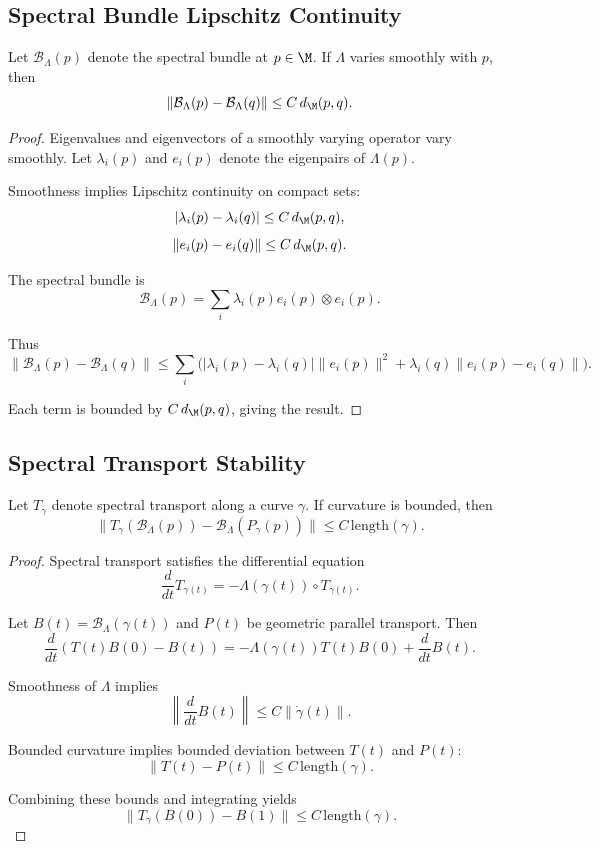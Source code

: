 \subsection{Spectral Bundle Lipschitz Continuity}

\begin{lemma}
Let $\mathcal{B}_\Lambda(p)$ denote the spectral bundle at $p \in \M$.
If $\Lambda$ varies smoothly with $p$, then
\[
\|\mathcal{B}_\Lambda(p) - \mathcal{B}_\Lambda(q)\|
\le
C\, d_\M(p,q).
\]
\end{lemma}

\begin{proof}
Eigenvalues and eigenvectors of a smoothly varying operator vary smoothly.
Let $\lambda_i(p)$ and $e_i(p)$ denote the eigenpairs of $\Lambda(p)$.

Smoothness implies Lipschitz continuity on compact sets:
\[
|\lambda_i(p) - \lambda_i(q)| \le C\, d_\M(p,q),
\]
\[
\|e_i(p) - e_i(q)\| \le C\, d_\M(p,q).
\]

The spectral bundle is
\[
\mathcal{B}_\Lambda(p)
= \sum_i \lambda_i(p) e_i(p) \otimes e_i(p).
\]

Thus
\[
\|\mathcal{B}_\Lambda(p) - \mathcal{B}_\Lambda(q)\|
\le
\sum_i
\big(
|\lambda_i(p) - \lambda_i(q)| \|e_i(p)\|^2
+ \lambda_i(q) \|e_i(p) - e_i(q)\|
\big).
\]

Each term is bounded by $C\, d_\M(p,q)$, giving the result.
\end{proof}

\subsection{Spectral Transport Stability}

\begin{lemma}
Let $T_\gamma$ denote spectral transport along a curve $\gamma$.  
If curvature is bounded, then
\[
\|T_\gamma(\mathcal{B}_\Lambda(p)) - \mathcal{B}_\Lambda(P_\gamma(p))\|
\le
C\, \mathrm{length}(\gamma).
\]
\end{lemma}

\begin{proof}
Spectral transport satisfies the differential equation
\[
\frac{d}{dt} T_{\gamma(t)}
= -\Lambda(\gamma(t)) \circ T_{\gamma(t)}.
\]

Let $B(t) = \mathcal{B}_\Lambda(\gamma(t))$ and $P(t)$ be geometric parallel
transport. Then
\[
\frac{d}{dt}(T(t)B(0) - B(t))
= -\Lambda(\gamma(t))T(t)B(0)
+ \frac{d}{dt}B(t).
\]

Smoothness of $\Lambda$ implies
\[
\left\|\frac{d}{dt}B(t)\right\|
\le C \|\dot{\gamma}(t)\|.
\]

Bounded curvature implies bounded deviation between $T(t)$ and $P(t)$:
\[
\|T(t) - P(t)\| \le C\, \mathrm{length}(\gamma).
\]

Combining these bounds and integrating yields
\[
\|T_\gamma(B(0)) - B(1)\|
\le
C\, \mathrm{length}(\gamma).
\]
\end{proof}

